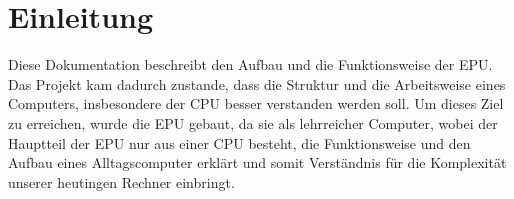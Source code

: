 \chapter{Einleitung}
\label{c:einleitung}
Diese Dokumentation beschreibt den Aufbau und die Funktionsweise der \ac{EPU}. Das Projekt kam
dadurch zustande, dass die Struktur und die Arbeitsweise eines Computers, insbesondere der
\ac{CPU} besser verstanden werden soll. Um dieses Ziel zu erreichen, wurde die \ac{EPU} gebaut, da
sie als lehrreicher Computer, wobei der Hauptteil der \ac{EPU} nur aus einer \ac{CPU} besteht, die
Funktionsweise und den Aufbau eines Alltagscomputer erklärt und somit Verständnis für die
Komplexität unserer heutingen Rechner einbringt.
